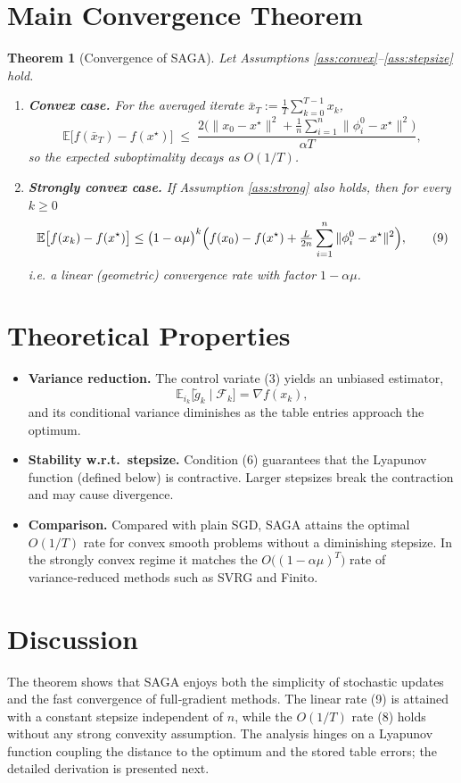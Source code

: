 \documentclass{article}
\newtheorem{theorem}{Theorem}
\newcommand{\E}{\mathbb{E}}
\begin{document}
\section*{Main Convergence Theorem}
\begin{theorem}[Convergence of SAGA]\label{thm:conv}
Let Assumptions \ref{ass:convex}–\ref{ass:stepsize} hold.
\begin{enumerate}[label=(\roman*)]
\item \textbf{Convex case.} For the averaged iterate $\bar x_T:=\frac1T\sum_{k=0}^{T-1}x_k$,
\[
\E\bigl[f(\bar x_T)-f(x^\star)\bigr]\;\le\;
\frac{2\bigl(\|x_0-x^\star\|^2+ \tfrac{1}{n}\sum_{i=1}^n\|\phi_i^{0}-x^\star\|^2\bigr)}{\alpha T},
\tag{8}
\]
so the expected suboptimality decays as $O(1/T)$.

\item \textbf{Strongly convex case.} If Assumption \ref{ass:strong} also holds, then for every $k\ge0$
\[
\E\bigl[f(x_k)-f(x^\star)\bigr]\le
\bigl(1-\alpha\mu\bigr)^{k}\Bigl(
f(x_0)-f(x^\star)+\tfrac{L}{2n}\sum_{i=1}^{n}\|\phi_i^{0}-x^\star\|^2\Bigr),
\tag{9}
\]
i.e. a linear (geometric) convergence rate with factor $1-\alpha\mu$.
\end{enumerate}
\end{theorem}

\section*{Theoretical Properties}
\begin{itemize}
\item \textbf{Variance reduction.} The control variate (3) yields an unbiased estimator,
\[
\E_{i_k}\bigl[\tilde g_k\mid\mathcal F_k\bigr]=\nabla f(x_k),
\tag{10}
\]
and its conditional variance diminishes as the table entries approach the optimum.
\item \textbf{Stability w.r.t.\ stepsize.} Condition (6) guarantees that the Lyapunov function (defined below) is contractive. Larger stepsizes break the contraction and may cause divergence.
\item \textbf{Comparison.} Compared with plain SGD, SAGA attains the optimal $O(1/T)$ rate for convex smooth problems without a diminishing stepsize. In the strongly convex regime it matches the $O\bigl((1-\alpha\mu)^T\bigr)$ rate of variance‑reduced methods such as SVRG and Finito.
\end{itemize}

\section*{Discussion}
The theorem shows that SAGA enjoys both the simplicity of stochastic updates and the fast convergence of full‑gradient methods. The linear rate (9) is attained with a constant stepsize independent of $n$, while the $O(1/T)$ rate (8) holds without any strong convexity assumption. The analysis hinges on a Lyapunov function coupling the distance to the optimum and the stored table errors; the detailed derivation is presented next.
\end{document}
